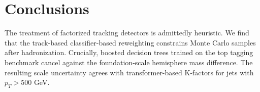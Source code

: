 \section{Conclusions}\label{sec:conclusions}

The treatment of factorized tracking detectors is admittedly heuristic.
We find that the track-based classifier-based reweighting constrains
Monte Carlo samples after hadronization. Crucially, boosted decision
trees trained on the top tagging benchmark cancel against the
foundation-scale hemisphere mass difference. The resulting scale
uncertainty agrees with transformer-based K-factors for jets with $p_T >
500$ GeV.

